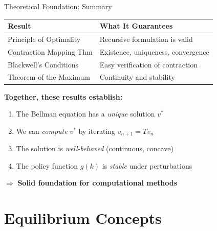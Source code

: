 \documentclass[10pt,english,aspectratio=169]{beamer}
\begin{document}
\begin{frame}{Theoretical Foundation: Summary}
\begin{center}
\begin{tabular}{l l}
\toprule
\textbf{Result} & \textbf{What It Guarantees} \\
\midrule
Principle of Optimality & Recursive formulation is valid \\
Contraction Mapping Thm & Existence, uniqueness, convergence \\
Blackwell's Conditions & Easy verification of contraction \\
Theorem of the Maximum & Continuity and stability \\
\bottomrule
\end{tabular}
\end{center}

\bigskip
\textbf{Together, these results establish:}
\begin{enumerate}
    \item The Bellman equation has a \emph{unique} solution $v^*$
    \item We can \emph{compute} $v^*$ by iterating $v_{n+1} = Tv_n$
    \item The solution is \emph{well-behaved} (continuous, concave)
    \item The policy function $g(k)$ is \emph{stable} under perturbations
\end{enumerate}

\bigskip
$\Rightarrow$ \textbf{Solid foundation for computational methods}
\end{frame}


\section{Equilibrium Concepts}
\end{document}
